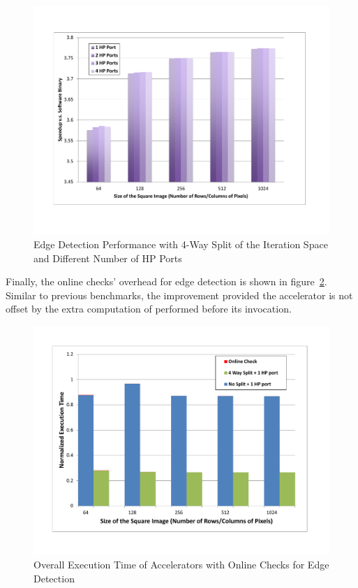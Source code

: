 \begin{figure}[htp]
\begin{center}
\includegraphics[width=1.0\linewidth]{chap6fig/convPortPerf.pdf}
\caption{Edge Detection Performance with 4-Way Split of the Iteration Space and Different Number of HP Ports
\label{fig:convPorts}}
\end{center}
\end{figure}

Finally, the online checks' overhead for edge detection is shown in figure~\ref{fig:conv2Phase}. Similar to previous benchmarks, the improvement provided the accelerator is not offset by the extra computation of performed before its invocation.

\begin{figure}[htp]
\begin{center}
\includegraphics[width=1.0\linewidth]{chap6fig/conv2phase.pdf}
\caption{Overall Execution Time of Accelerators with Online Checks for Edge Detection
\label{fig:conv2Phase}}
\end{center}
\end{figure}




